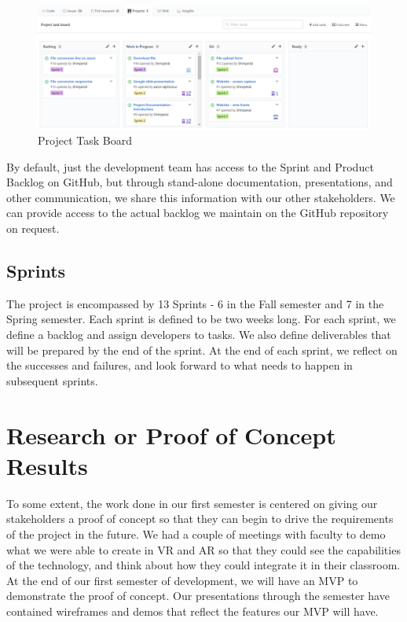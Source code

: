 \begin{figure}[H]
    \centering
    \includegraphics[width=\textwidth]{ProjectTaskBoard.png}
    \caption{Project Task Board}
    \label{fig:ProjectTaskBoard}
\end{figure}

By default, just the development team has access to the Sprint and Product 
Backlog on GitHub, but through stand-alone documentation, presentations, and 
other communication, we share this information with our other stakeholders. 
We can provide access to the actual backlog we maintain on the GitHub repository
on request.

\subsection{Sprints}
The project is encompassed by 13 Sprints - 6 in the Fall semester and 7 in the 
Spring semester. Each sprint is defined to be two weeks long. 
For each sprint, we define a backlog and assign developers to tasks. We also 
define deliverables that will be prepared by the end of the sprint. At the end 
of each sprint, we reflect on the successes and failures, and look forward to 
what needs to happen in subsequent sprints.


\section{Research or Proof of Concept Results}


To some extent, the work done in our first semester is centered on giving our 
stakeholders a proof of concept so that they can begin to drive the requirements
of the project in the future. We had a couple of meetings with faculty to demo 
what we were able to create in VR and AR so that they could see the capabilities
of the technology, and think about how they could integrate it in their 
classroom. At the end of our first semester of development, we will have an MVP
to demonstrate the proof of concept. Our presentations through the semester have 
contained wireframes and demos that reflect the features our MVP will have.

